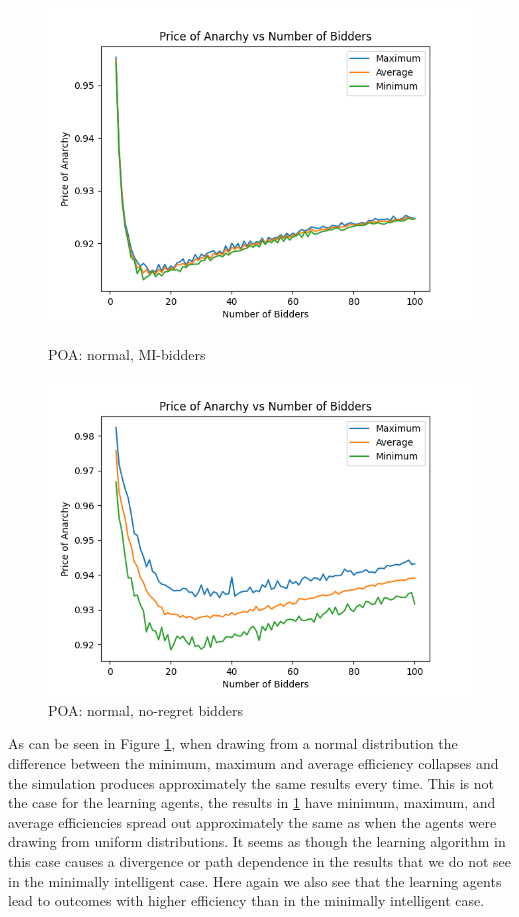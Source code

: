 \documentclass[12pt,twoside]{reedthesis}
\begin{document}
\begin{figure}
	\centering
	\begin{minipage}{0.49\textwidth}
		\centering
		\includegraphics[scale=0.5]{Figures/zi_normal}
		\caption{POA: normal, MI-bidders}
		\label{figure:mi_noraml}
	\end{minipage}
	\begin{minipage}{0.49\textwidth}
		\centering
		\includegraphics[scale=0.5]{Figures/asymmetric}
		\caption{POA: normal, no-regret bidders}
		\label{figure:normal}
	\end{minipage}
\end{figure}

As can be seen in Figure \ref{figure:normal}, when drawing from a normal distribution the difference between the minimum, maximum and average efficiency collapses and the simulation produces approximately the same results every time. This is not the case for the learning agents, the results in \ref{figure:normal} have minimum, maximum, and average efficiencies spread out approximately the same as when the agents were drawing from uniform distributions. It seems as though the learning algorithm in this case causes a divergence or path dependence in the results that we do not see in the minimally intelligent case. Here again we also see that the learning agents lead to outcomes with higher efficiency than in the minimally intelligent case.
\end{document}

